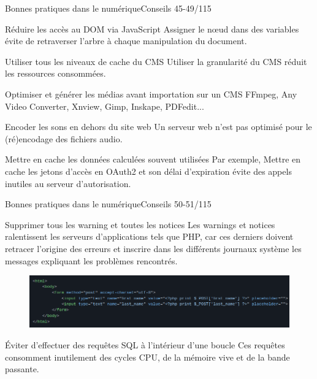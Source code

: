 
\begin{frame}{Bonnes pratiques dans le numérique}{Conseils 45-49/115}
\begin{block}{Réduire les accès au DOM via JavaScript}
Assigner le nœud dans des variables évite de retraverser l’arbre à chaque manipulation du document.
\end{block}

\begin{block}{Utiliser tous les niveaux de cache du CMS}
Utiliser la granularité du CMS réduit les ressources consommées.
\end{block}

\begin{block}{Optimiser et générer les médias avant importation sur un CMS}
 FFmpeg, Any Video Converter, Xnview, Gimp, Inskape, PDFedit...
\end{block}

\begin{block}{Encoder les sons en dehors du site web}
Un serveur web n’est pas optimisé pour le (ré)encodage des fichiers audio.
\end{block}

\begin{block}{Mettre en cache les données calculées souvent utilisées}
Par exemple, Mettre en cache les jetons d'accès en OAuth2 et son délai d'expiration évite des appels inutiles au serveur d'autorisation.
\end{block}


\end{frame}


\begin{frame}{Bonnes pratiques dans le numérique}{Conseils 50-51/115}
\begin{block}{Supprimer tous les warning et toutes les notices}
Les warnings et notices ralentissent les serveurs d’applications tels que PHP, car ces derniers doivent retracer l’origine des erreurs et inscrire dans les différents journaux système les messages expliquant les problèmes rencontrés.
\begin{figure}
    \centering
    \includegraphics[scale=0.3]{chapitre2/wdd5/fig/c1.png}
\end{figure}
\end{block}

\begin{block}{Éviter d'effectuer des requêtes SQL à l’intérieur d’une boucle}
 Ces requêtes consomment inutilement des cycles CPU, de la mémoire vive et de la bande passante.
\end{block}

\end{frame}



